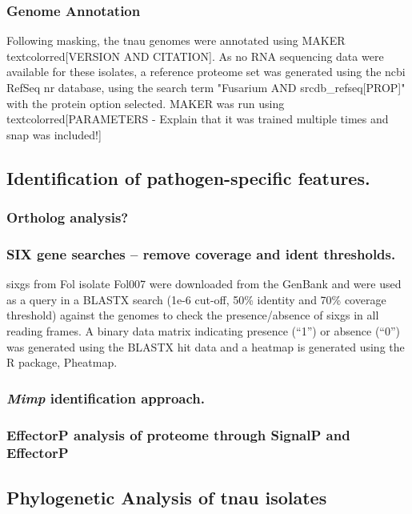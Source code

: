 \subsubsection{Genome Annotation}
Following masking, the \ac{tnau} genomes were annotated using MAKER textcolor{red}{[VERSION AND CITATION]}. As no RNA sequencing data were available for these isolates, a reference proteome set was generated using the \ac{ncbi} RefSeq nr database, using the search term "Fusarium AND srcdb\_refseq[PROP]" with the protein option selected. MAKER was run using textcolor{red}{[PARAMETERS - Explain that it was trained multiple times and snap was included!]}

\subsection{Identification of pathogen-specific features.}

\subsubsection{Ortholog analysis?}

\subsubsection{SIX gene searches – remove coverage and ident thresholds.}
\Acp{sixg} from Fol isolate Fol007 were downloaded from the GenBank and were used as a query in a BLASTX search (1e-6 cut-off, 50\% identity and 70\% coverage threshold) against the genomes to check the presence/absence of \acp{sixg} in all reading frames. A binary data matrix indicating presence (“1”) or absence (“0”) was generated using the BLASTX hit data and a heatmap is generated using the R package, Pheatmap.

\subsubsection{\textit{Mimp} identification approach.}

\subsubsection{EffectorP analysis of proteome through SignalP and EffectorP}


\subsection{Phylogenetic Analysis of \ac{tnau} isolates}\label{chap2:phylogeny}

